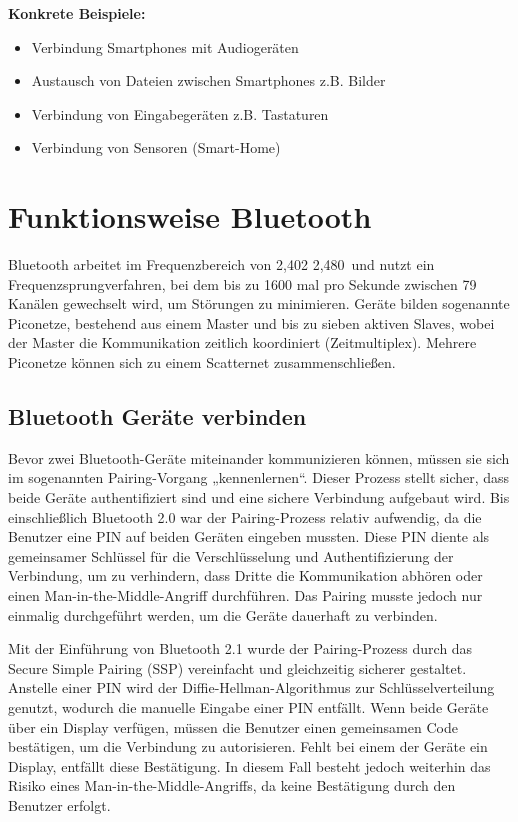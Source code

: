 \textbf{Konkrete Beispiele:}
\begin{itemize}
	\item{Verbindung Smartphones mit Audioger\"aten}
	\item{Austausch von Dateien zwischen Smartphones z.B. Bilder}
	\item{Verbindung von Eingabeger\"aten z.B. Tastaturen}
	\item{Verbindung von Sensoren (Smart-Home)}
\end{itemize}
\cite{Sauter2023} \cite{Baun2022}

\section{Funktionsweise Bluetooth}
Bluetooth arbeitet im Frequenzbereich von 2,402\,\text{--}\,2,480\, und nutzt ein Frequenzsprungverfahren, bei dem bis zu 1600 mal pro Sekunde zwischen 79 Kanälen gewechselt wird, um St\"orungen zu minimieren. Ger\"ate bilden sogenannte Piconetze, bestehend aus einem Master und bis zu sieben aktiven Slaves, wobei der Master die Kommunikation zeitlich koordiniert (Zeitmultiplex). Mehrere Piconetze k\"onnen sich zu einem Scatternet zusammenschließen.
\cite{Baun2022}



\subsection{Bluetooth Ger\"ate verbinden}

Bevor zwei Bluetooth-Geräte miteinander kommunizieren können, müssen sie sich im sogenannten Pairing-Vorgang „kennenlernen“. Dieser Prozess stellt sicher, dass beide Geräte authentifiziert sind und eine sichere Verbindung aufgebaut wird. Bis einschließlich Bluetooth 2.0 war der Pairing-Prozess relativ aufwendig, da die Benutzer eine PIN auf beiden Geräten eingeben mussten. Diese PIN diente als gemeinsamer Schlüssel für die Verschlüsselung und Authentifizierung der Verbindung, um zu verhindern, dass Dritte die Kommunikation abhören oder einen Man-in-the-Middle-Angriff durchführen. Das Pairing musste jedoch nur einmalig durchgeführt werden, um die Geräte dauerhaft zu verbinden.
\cite{Baun2022}

Mit der Einführung von Bluetooth 2.1 wurde der Pairing-Prozess durch das Secure Simple Pairing (SSP) vereinfacht und gleichzeitig sicherer gestaltet. Anstelle einer PIN wird der Diffie-Hellman-Algorithmus zur Schlüsselverteilung genutzt, wodurch die manuelle Eingabe einer PIN entfällt. Wenn beide Geräte über ein Display verfügen, müssen die Benutzer einen gemeinsamen Code bestätigen, um die Verbindung zu autorisieren. Fehlt bei einem der Geräte ein Display, entfällt diese Bestätigung. In diesem Fall besteht jedoch weiterhin das Risiko eines Man-in-the-Middle-Angriffs, da keine Bestätigung durch den Benutzer erfolgt.
\cite{Baun2022}

